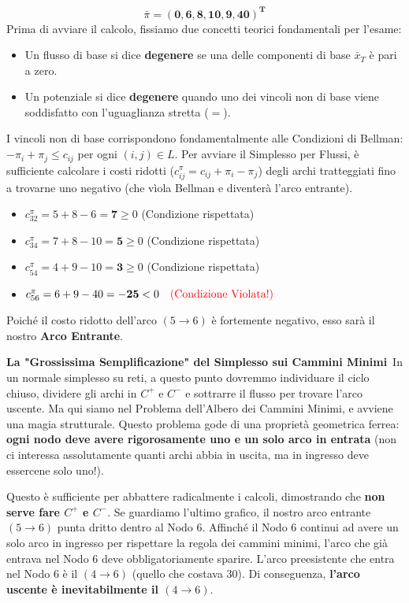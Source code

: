 \documentclass[12pt, a4paper]{article}
\begin{document}
	$$\bar{\pi} = \mathbf{(0, 6, 8, 10, 9, 40)^T}$$
	Prima di avviare il calcolo, fissiamo due concetti teorici fondamentali per l'esame:
	\begin{itemize}[label=$\circ$, itemsep=2pt, leftmargin=1.5cm]
		\item Un flusso di base si dice \textbf{degenere} se una delle componenti di base $\bar{x}_T$ è pari a zero.
		\item Un potenziale si dice \textbf{degenere} quando uno dei vincoli non di base viene soddisfatto con l'uguaglianza stretta ($=$).
	\end{itemize}
	
	I vincoli non di base corrispondono fondamentalmente alle Condizioni di Bellman: $-\pi_i + \pi_j \leq c_{ij}$ per ogni $(i,j) \in L$.
	Per avviare il Simplesso per Flussi, è sufficiente calcolare i costi ridotti ($c_{ij}^\pi = c_{ij} + \pi_i - \pi_j$) degli archi tratteggiati fino a trovarne uno negativo (che vìola Bellman e diventerà l'arco entrante).
	\begin{itemize}
		\item $c_{32}^\pi = 5 + 8 - 6 = \mathbf{7} \geq 0$ (Condizione rispettata)
		\item $c_{34}^\pi = 7 + 8 - 10 = \mathbf{5} \geq 0$ (Condizione rispettata)
		\item $c_{54}^\pi = 4 + 9 - 10 = \mathbf{3} \geq 0$ (Condizione rispettata)
		\item $c_{56}^\pi = 6 + 9 - 40 = \mathbf{-25} < 0 \quad \text{\textcolor{red}{(Condizione Violata!)}}$
	\end{itemize}
	
	Poiché il costo ridotto dell'arco $(5\to6)$ è fortemente negativo, esso sarà il nostro \textbf{Arco Entrante}.
	
	\vspace{0.4cm}
	\textbf{La "Grossissima Semplificazione" del Simplesso sui Cammini Minimi}\
	In un normale simplesso su reti, a questo punto dovremmo individuare il ciclo chiuso, dividere gli archi in $C^+$ e $C^-$ e sottrarre il flusso per trovare l'arco uscente.
	Ma qui siamo nel Problema dell'Albero dei Cammini Minimi, e avviene una magia strutturale. Questo problema gode di una proprietà geometrica ferrea: \textbf{ogni nodo deve avere rigorosamente uno e un solo arco in entrata} (non ci interessa assolutamente quanti archi abbia in uscita, ma in ingresso deve essercene solo uno!).
	
	Questo è sufficiente per abbattere radicalmente i calcoli, dimostrando che \textbf{non serve fare $C^+$ e $C^-$}. Se guardiamo l'ultimo grafico, il nostro arco entrante $(5\to6)$ punta dritto dentro al Nodo 6. Affinché il Nodo 6 continui ad avere un solo arco in ingresso per rispettare la regola dei cammini minimi, l'arco che già entrava nel Nodo 6 deve obbligatoriamente sparire.
	L'arco preesistente che entra nel Nodo 6 è il $(4\to6)$ (quello che costava 30). Di conseguenza, \textbf{l'arco uscente è inevitabilmente il $(4\to6)$}.
	
\end{document}
